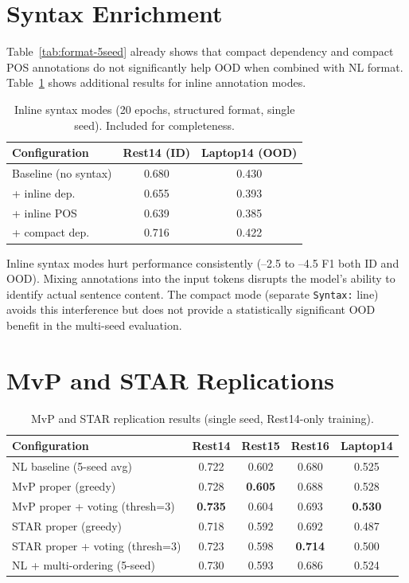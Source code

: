 \documentclass[12pt,a4paper]{report}
\begin{document}
\section{Syntax Enrichment}\label{sec:syntax-results}

Table~\ref{tab:format-5seed} already shows that compact dependency and compact POS annotations do not significantly help OOD when combined with NL format. Table~\ref{tab:syntax-inline} shows additional results for inline annotation modes.

\begin{table}[H]
\centering
\caption{Inline syntax modes (20 epochs, structured format, single seed). Included for completeness.}
\label{tab:syntax-inline}
\small
\begin{tabular}{@{}lcc@{}}
\toprule
\textbf{Configuration} & \textbf{Rest14 (ID)} & \textbf{Laptop14 (OOD)} \\
\midrule
Baseline (no syntax) & 0.680 & 0.430 \\
+ inline dep. & 0.655 & 0.393 \\
+ inline POS & 0.639 & 0.385 \\
+ compact dep. & 0.716 & 0.422 \\
\bottomrule
\end{tabular}
\end{table}

Inline syntax modes hurt performance consistently (--2.5 to --4.5 F1 both ID and OOD). Mixing annotations into the input tokens disrupts the model's ability to identify actual sentence content. The compact mode (separate \texttt{Syntax:} line) avoids this interference but does not provide a statistically significant OOD benefit in the multi-seed evaluation.


\section{MvP and STAR Replications}\label{sec:mvp-star}

\begin{table}[H]
\centering
\caption{MvP and STAR replication results (single seed, Rest14-only training).}
\label{tab:mvp-star}
\small
\begin{tabular}{@{}lcccc@{}}
\toprule
\textbf{Configuration} & \textbf{Rest14} & \textbf{Rest15} & \textbf{Rest16} & \textbf{Laptop14} \\
\midrule
NL baseline (5-seed avg) & 0.722 & 0.602 & 0.680 & 0.525 \\
\midrule
MvP proper (greedy) & 0.728 & \textbf{0.605} & 0.688 & 0.528 \\
MvP proper + voting (thresh=3) & \textbf{0.735} & 0.604 & 0.693 & \textbf{0.530} \\
STAR proper (greedy) & 0.718 & 0.592 & 0.692 & 0.487 \\
STAR proper + voting (thresh=3) & 0.723 & 0.598 & \textbf{0.714} & 0.500 \\
\midrule
NL + multi-ordering (5-seed) & 0.730 & 0.593 & 0.686 & 0.524 \\
\bottomrule
\end{tabular}
\end{table}
\end{document}
